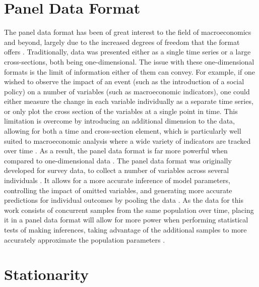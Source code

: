 
\section{Panel Data Format}


The panel data format has been of great interest to the field of macroeconomics and beyond, largely due to the increased degrees of freedom that the format offers \citep{hsiao}. Traditionally, data was presented either as a single time series or a large cross-sections, both being one-dimensional. The issue with these one-dimensional formats is the limit of information either of them can convey. For example, if one wished to observe the impact of an event (such as the introduction of a social policy) on a number of variables (such as macroeconomic indicators), one could either measure the change in each variable individually as a separate time series, or only plot the cross section of the variables at a single point in time. This limitation is overcome by introducing an additional dimension to the data, allowing for both a time and cross-section element, which is particularly well suited to macroeconomic analysis where a wide variety of indicators are tracked over time \citep{hsiao}. As a result, the panel data format is far more powerful when compared to one-dimensional data \citep{hsiao}. The panel data format was originally developed for survey data, to collect a number of variables across several individuals \citep{smith}.  It allows for a more accurate inference of model parameters, controlling the impact of omitted variables, and generating more accurate predictions for individual outcomes by pooling the data \citep{hsiao}. As the data for this work consists of concurrent samples from the same population over time, placing it in a panel data format will allow for more power when performing statistical tests of making inferences, taking advantage of the additional samples to more accurately approximate the population parameters \citep{smith}. %


\section{Stationarity}


